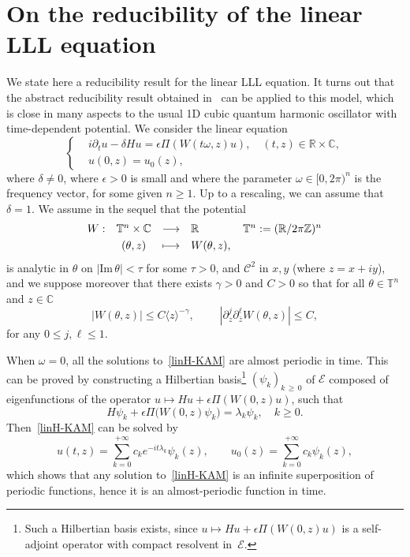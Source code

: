 \documentclass[10pt]{amsart}
\theoremstyle{definition}\newtheorem{defi}[theo]{Definition}\newtheorem{rema}[theo]{Remark}\newtheorem{exam}[theo]{Example}\newtheorem{exem}[theo]{Example}\newtheorem{nota}[theo]{Notation}
\newcommand{\C}{\mathbb{C}}
\newcommand{\R}{\mathbb{R}}
\newcommand{\T}{\mathbb{T}}
\newcommand{\Z}{\mathbb{Z}}
\newcommand{\E}{\mathcal{E}}
\newcommand{\clC}{\mathcal{C}}
\newcommand*\eps{\epsilon}
\newcommand*\dis{\displaystyle}
\newcommand{\om}{\omega}
\newcommand{\ov}{\overline}
\newcommand{\<}{\langle}
\renewcommand{\>}{\rangle}
\begin{document}
\section{On the reducibility of the linear LLL equation}\label{appendixB}

We state here a reducibility result for the linear LLL equation. It turns out that the abstract reducibility result obtained in~\cite{Grebert-Thomann} can be applied to this model, which is close in many aspects to the usual 1D cubic quantum harmonic oscillator with time-dependent potential. We consider the linear equation
\begin{equation}\label{linH-KAM}
\begin{cases}
&i\partial_t u-\delta Hu=\eps \Pi(W(t \om,z)u), \quad (t,z)\in \R\times \C,\\
&u(0,z)= u_0(z),
\end{cases}
\end{equation}
where $\delta \neq 0$, where $\epsilon >0$ is small and where the parameter $\omega \in [0,2\pi)^n$ is the frequency vector, for some given $n
\geq 1$. Up to a rescaling, we can assume that $\delta =1$. We assume in the sequel that the potential
\[
\begin{array}{rccl}
W : &\T^n\times \C&\longrightarrow&\R \qquad \qquad \T^n: =(\R/2\pi \Z)^n\\[3pt]
\dis & (\theta, z) &\longmapsto & W(\theta,z),
\end{array}
\]
is analytic in $\theta$ on $|\text{Im}\,\theta|<\tau$ for some $\tau>0$, and $\clC^{2}$ in $x,y$ (where $z=x+iy$), and we suppose moreover that there exists $\gamma>0$ and $C>0$ so that for all $\theta \in \T^{n}$ and $z\in \C$
\begin{equation}\label{cond-W}
|W(\theta,z)|\leq C\<z\>^{-\gamma},\qquad\; \left|\partial^j_{z}\partial^{\ell}_{\ov z}W(\theta,z)\right|\leq C,
\end{equation}
for any $0 \leq j, \ell \leq 1$.

When $\om =0$, all the solutions to~\eqref{linH-KAM} are almost periodic in time. This can be proved by constructing a Hilbertian basis\footnote{Such a Hilbertian basis exists, since $u \mapsto Hu+\eps \Pi(W(0,z)u)$ is a self-adjoint operator with compact resolvent in~$\E$.} $(\psi_k)_{k\,\geq\,0}$ of $\E$ composed of eigenfunctions of the operator $u \mapsto Hu+\eps \Pi(W(0,z)u)$, such that
\[
H\psi_k+\eps \Pi\big(W(0,z)\psi_k\big)=\lambda_k \psi_k, \quad k \geq 0.
\]
Then~\eqref{linH-KAM} can be solved by
\[
u(t,z)= \sum_{k=0}^{+\infty}c_k e^{-it \lambda_k } \psi_k(z), \qquad u_0(z)= \sum_{k=0}^{+\infty}c_k \psi_k(z),
\]
which shows that any solution to~\eqref{linH-KAM} is an infinite superposition of periodic functions, hence it is an almost-periodic function in time.
\end{document}
